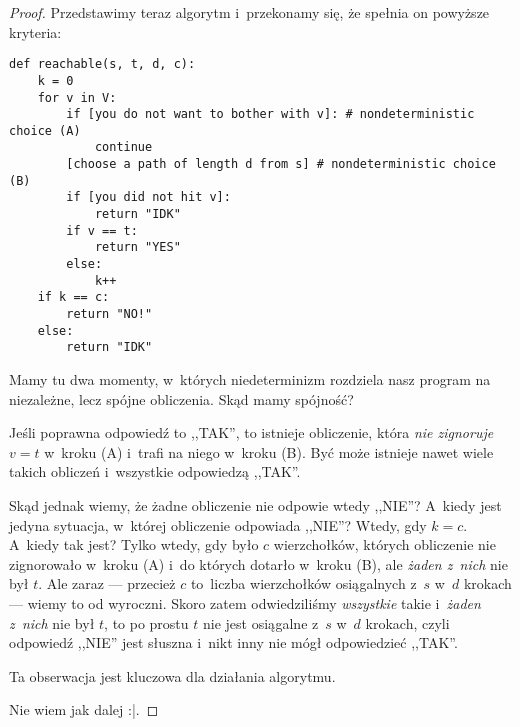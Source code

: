 \begin{proof}
    Przedstawimy teraz algorytm i~przekonamy się, że spełnia on powyższe kryteria:
\begin{verbatim}
def reachable(s, t, d, c):
    k = 0
    for v in V:
        if [you do not want to bother with v]: # nondeterministic choice (A)
            continue
        [choose a path of length d from s] # nondeterministic choice (B)
        if [you did not hit v]:
            return "IDK"
        if v == t:
            return "YES"
        else:
            k++
    if k == c:
        return "NO!"
    else:
        return "IDK"
\end{verbatim}
    Mamy tu dwa momenty, w~których niedeterminizm rozdziela nasz program na niezależne, lecz spójne obliczenia. Skąd mamy spójność?
    
    Jeśli poprawna odpowiedź to ,,TAK'', to istnieje obliczenie, która \emph{nie zignoruje} \(v = t\) w~kroku (A) i~trafi na niego w~kroku (B). Być może istnieje nawet wiele takich obliczeń i~wszystkie odpowiedzą ,,TAK''.
    
    Skąd jednak wiemy, że żadne obliczenie nie odpowie wtedy ,,NIE''? A~kiedy jest jedyna sytuacja, w~której obliczenie odpowiada ,,NIE''? Wtedy, gdy \(k = c\). A~kiedy tak jest? Tylko wtedy, gdy było \(c\) wierzchołków, których obliczenie nie zignorowało w~kroku (A) i~do których dotarło w~kroku (B), ale \emph{żaden z~nich} nie był \(t\). Ale zaraz --- przecież \(c\) to~liczba wierzchołków osiągalnych z~\(s\) w~\(d\) krokach --- wiemy to od wyroczni. Skoro zatem odwiedziliśmy \emph{wszystkie} takie i~\emph{żaden z~nich} nie był \(t\), to po prostu \(t\) nie jest osiągalne z~\(s\) w~\(d\) krokach, czyli odpowiedź ,,NIE'' jest słuszna i~nikt inny nie mógł odpowiedzieć ,,TAK''.
    
    Ta obserwacja jest kluczowa dla działania algorytmu.
    
    Nie wiem jak dalej :|.
    
\end{proof}